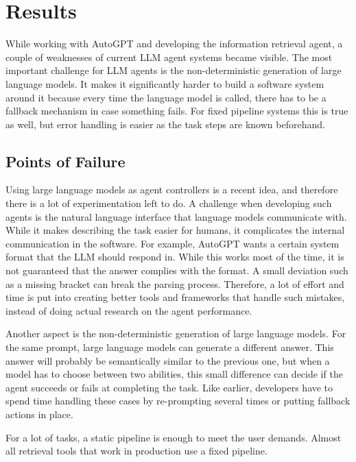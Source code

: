 \documentclass[../main.tex]{subfiles}
\begin{document}
\chapter{Results}
\label{ch:results}

While working with AutoGPT and developing the information retrieval agent,
a couple of weaknesses of current LLM agent systems became visible.
The most important challenge for LLM agents is the non-deterministic generation of large language models.
It makes it significantly harder to build a software system around it because every time the language model is called,
there has to be a fallback mechanism in case something fails.
For fixed pipeline systems this is true as well,
but error handling is easier as the task steps are known beforehand.

\section{Points of Failure}

Using large language models as agent controllers is a recent idea, and therefore there is a lot of experimentation left to do.
A challenge when developing such agents is the natural language interface that language models communicate with.
While it makes describing the task easier for humans, it complicates the internal communication in the software.
For example, AutoGPT wants a certain system format that the LLM should respond in.
While this works most of the time, it is not guaranteed that the answer complies with the format.
A small deviation such as a missing bracket can break the parsing process.
Therefore, a lot of effort and time is put into creating better tools and frameworks that handle such mistakes,
instead of doing actual research on the agent performance.

Another aspect is the non-deterministic generation of large language models. %
For the same prompt, large language models can generate a different answer.
This answer will probably be semantically similar to the previous one,
but when a model has to choose between two abilities,
this small difference can decide if the agent succeeds or fails at completing the task.
Like earlier, developers have to spend time handling these cases by re-prompting several times or putting fallback actions in place.

For a lot of tasks, a static pipeline is enough to meet the user demands.
Almost all retrieval tools that work in production use a fixed pipeline.
\end{document}

